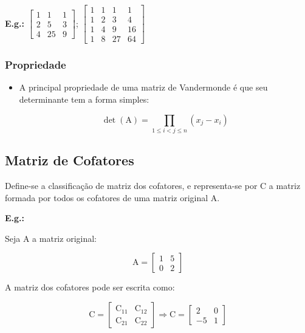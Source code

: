 \documentclass[a4paper,12pt]{article}
\begin{document}
\textbf{E.g.:} $ \begin{bmatrix}
1 & 1 & 1 \\
2 & 5 & 3 \\
4 & 25 & 9
\end{bmatrix} $; $ \begin{bmatrix}
 1 & 1 & 1 & 1 \\
 1 & 2 & 3 & 4 \\
 1 & 4 & 9 & 16 \\
 1 & 8 & 27 & 64
\end{bmatrix} $

\subsubsection{Propriedade}

\begin{itemize}

    \item A principal propriedade de uma matriz de Vandermonde é que seu determinante tem a forma simples:

    $$ \det(\text{A})=\prod_{1\le i<j\le n} (x_j-x_i) $$
\end{itemize}

\subsection{Matriz de Cofatores}

Define-se a classificação de matriz dos cofatores, e representa-se por $ \text{C} $ a matriz formada por todos os cofatores de uma matriz original $ \text{A} $.

\textbf{E.g.:}

Seja $ \text{A} $ a matriz original:

 $$ \text{A} = \begin{bmatrix}
1 & 5 \\
0 & 2
\end{bmatrix} $$

A matriz dos cofatores pode ser escrita como:

$$ \text{C} = \begin{bmatrix}
\text{C}_{11} & \text{C}_{12}\\
\text{C}_{21} & \text{C}_{22}
\end{bmatrix} \Rightarrow \text{C} = \begin{bmatrix}
2 & 0 \\
-5 & 1
\end{bmatrix} $$
\end{document}
